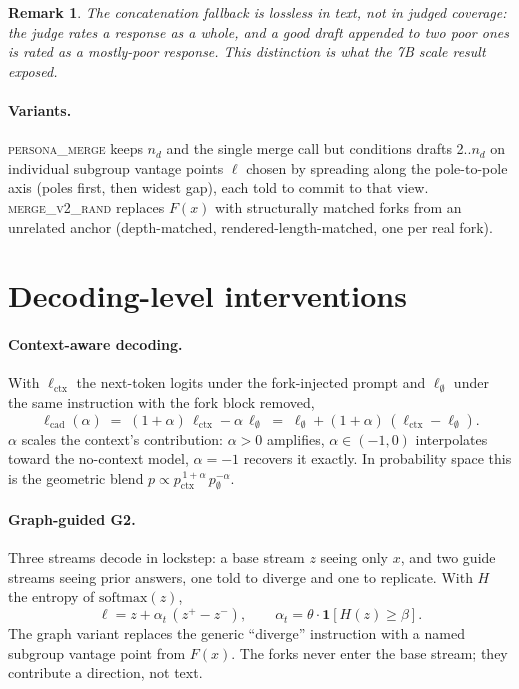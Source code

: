 \documentclass[11pt]{article}
\newtheorem{remark}{Remark}
\begin{document}
\begin{remark}
The concatenation fallback is lossless in \emph{text}, not in \emph{judged
coverage}: the judge rates a response as a whole, and a good draft appended to
two poor ones is rated as a mostly-poor response. This distinction is what the
7B scale result exposed.
\end{remark}

\paragraph{Variants.} \textsc{persona\_merge} keeps $n_d$ and the single merge
call but conditions drafts 2..$n_d$ on individual subgroup vantage points
$\ell$ chosen by spreading along the pole-to-pole axis (poles first, then
widest gap), each told to commit to that view. \textsc{merge\_v2\_rand}
replaces $F(x)$ with structurally matched forks from an unrelated anchor
(depth-matched, rendered-length-matched, one per real fork).

\section{Decoding-level interventions}

\label{sec:cad}
\paragraph{Context-aware decoding.} With $\ell_{\mathrm{ctx}}$ the next-token
logits under the fork-injected prompt and $\ell_{\emptyset}$ under the same
instruction with the fork block removed,
\[
  \ell_{\mathrm{cad}}(\alpha) \;=\; (1+\alpha)\,\ell_{\mathrm{ctx}} - \alpha\,\ell_{\emptyset}
  \;=\; \ell_{\emptyset} + (1+\alpha)\,(\ell_{\mathrm{ctx}} - \ell_{\emptyset}).
\]
$\alpha$ scales the context's contribution: $\alpha > 0$ amplifies,
$\alpha \in (-1, 0)$ interpolates toward the no-context model, $\alpha = -1$
recovers it exactly. In probability space this is the geometric blend
$p \propto p_{\mathrm{ctx}}^{\,1+\alpha}\, p_{\emptyset}^{-\alpha}$.

\paragraph{Graph-guided G2.} Three streams decode in lockstep: a base stream
$z$ seeing only $x$, and two guide streams seeing prior answers, one told to
diverge and one to replicate. With $H$ the entropy of $\mathrm{softmax}(z)$,
\[
  \ell = z + \alpha_t\,(z^{+} - z^{-}), \qquad
  \alpha_t = \theta\cdot \mathbf{1}[H(z) \ge \beta].
\]
The graph variant replaces the generic ``diverge'' instruction with a named
subgroup vantage point from $F(x)$. The forks never enter the base stream; they
contribute a direction, not text.
\end{document}
